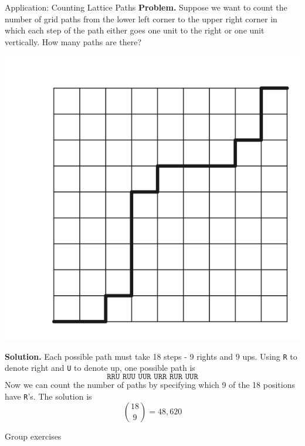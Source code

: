 \documentclass[10pt]{beamer}
\begin{document}
\begin{frame}{Application: Counting Lattice Paths}
\footnotesize 
\textbf{Problem.} Suppose we want to count the number of grid paths from the lower left corner to the upper right corner in which each step of the path either goes one unit to the right or one unit vertically. How many paths are there?
%
\begin{center}
\includegraphics[width=.3\textwidth]{images/lattice_paths.png}
\end{center}
%
\vfill 
\pause 
\textbf{Solution.} Each possible path must take 18 steps - 9 rights and 9 ups.  Using \texttt{R} to denote right and \texttt{U} to denote up, one possible path is
\[\texttt{RRU RUU UUR URR RUR UUR} \]
Now we can count the number of paths by specifying which 9 of the 18 positions have \texttt{R}'s.  The solution is 
\pause 
\[ \binom{18}{9} = 48,620\]
\end{frame}


\begin{frame}[standout]
Group exercises
\end{frame}
\end{document}

